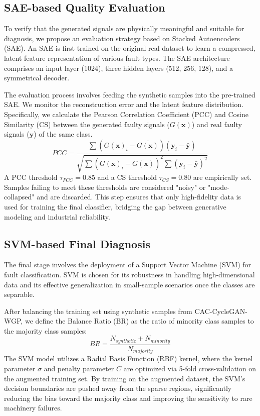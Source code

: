 \subsection{SAE-based Quality Evaluation}
To verify that the generated signals are physically meaningful and suitable for diagnosis, we propose an evaluation strategy based on Stacked Autoencoders (SAE). An SAE is first trained on the original real dataset to learn a compressed, latent feature representation of various fault types. The SAE architecture comprises an input layer (1024), three hidden layers (512, 256, 128), and a symmetrical decoder.

The evaluation process involves feeding the synthetic samples into the pre-trained SAE. We monitor the reconstruction error and the latent feature distribution. Specifically, we calculate the Pearson Correlation Coefficient (PCC) and Cosine Similarity (CS) between the generated faulty signals ($G(\boldsymbol{x})$) and real faulty signals ($\boldsymbol{y}$) of the same class.
\begin{equation}
PCC = \frac{\sum (G(\boldsymbol{x})_i - \bar{G(\boldsymbol{x})})(\boldsymbol{y}_i - \bar{\boldsymbol{y}})}{\sqrt{\sum (G(\boldsymbol{x})_i - \bar{G(\boldsymbol{x})})^2 \sum (\boldsymbol{y}_i - \bar{\boldsymbol{y}})^2}}
\end{equation}
A PCC threshold $\tau_{PCC} = 0.85$ and a CS threshold $\tau_{CS} = 0.80$ are empirically set. Samples failing to meet these thresholds are considered "noisy" or "mode-collapsed" and are discarded. This step ensures that only high-fidelity data is used for training the final classifier, bridging the gap between generative modeling and industrial reliability.

\subsection{SVM-based Final Diagnosis}
The final stage involves the deployment of a Support Vector Machine (SVM) for fault classification. SVM is chosen for its robustness in handling high-dimensional data and its effective generalization in small-sample scenarios once the classes are separable. 

After balancing the training set using synthetic samples from CAC-CycleGAN-WGP, we define the Balance Ratio (BR) as the ratio of minority class samples to the majority class samples:
\begin{equation}
BR = \frac{N_{synthetic} + N_{minority}}{N_{majority}}
\end{equation}
The SVM model utilizes a Radial Basis Function (RBF) kernel, where the kernel parameter $\sigma$ and penalty parameter $C$ are optimized via 5-fold cross-validation on the augmented training set. By training on the augmented dataset, the SVM's decision boundaries are pushed away from the sparse regions, significantly reducing the bias toward the majority class and improving the sensitivity to rare machinery failures.
